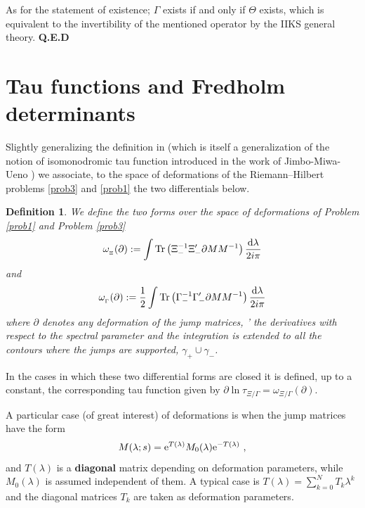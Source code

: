 \documentclass{article}
\newtheorem{defn}{Definition}[section]
\def\d{{\rm d}}
\def \pa{\partial}
\def\Tr{\mathop{{\rm Tr}}}
\def\QED{ {\bf Q.E.D}\par \vskip 4pt}
\newcommand{\be}{\begin{eqnarray}}
\newcommand{\ee}{\end{eqnarray}}
\def\le{\left}
\def\ri{\right}
\begin{document}
As for the statement of existence;  $\Gamma$ exists if and only if $\Theta$ exists, which is equivalent to the invertibility of the mentioned operator by the IIKS general theory.
\QED
%
%
%




















\section{Tau functions and Fredholm determinants}\label{taufunctions}

Slightly generalizing the definition in \cite{BertolaIsoTau} (which is itself a generalization of the notion of isomonodromic tau function introduced in the work of Jimbo-Miwa-Ueno \cite{JMU1,JMU2,JMU3}) we associate, to the space of deformations of the  Riemann--Hilbert problems \ref{prob3} and \ref{prob1} the two differentials below. 
%
%
\begin{shaded}
\begin{defn}
\label{defforms}
We define the two forms over the space of deformations of Problem \ref{prob1} and  Problem \ref{prob3}
\be
\omega_{_\Xi}(\pa):= \int \Tr \le(\Xi_-^{-1}\Xi'_- \pa M M^{-1}\ri) \frac{ \d\lambda}{2i\pi}
\label{omegaxi}
\ee
and
\be
\omega_{_\Gamma}(\pa):= \frac 12 \int \Tr \le(\Gamma_-^{-1}\Gamma'_- \pa M M^{-1}\ri) \frac{ \d\lambda}{2i\pi}
\label{omegagamma}
\ee
where $\pa$ denotes any deformation of the jump matrices, ' the derivatives with respect to the spectral parameter and the integration is extended to all the contours where the jumps are supported, $\gamma_+\cup \gamma_-$.
\end{defn}
\end{shaded}
In the cases in which these two differential forms are closed it is defined, up to a constant, the corresponding tau function given by
$\pa\ln\tau_{\Xi/\Gamma}=\omega_{\Xi/\Gamma}(\pa).$

A particular case (of great interest) of deformations is when the jump matrices have the form  
\be
M(\lambda;s) = {\rm e}^{T(\lambda)} M_0(\lambda) {\rm e}^{-T(\lambda)}\ ,
\label{sdep}
\ee
and $T(\lambda)$ is a {\bf diagonal} matrix depending on deformation parameters, while $M_0(\lambda)$ is assumed independent of them. A typical case is $T(\lambda) = \sum_{k=0}^N T_k\lambda^k$ and the diagonal matrices $T_k$ are taken as deformation parameters.
\end{document}
